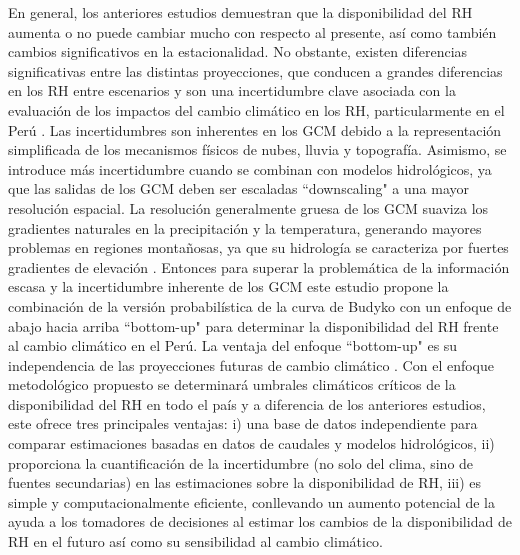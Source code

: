 \documentclass[12pt]{article}
\begin{document}
En general, los anteriores estudios demuestran que la disponibilidad del RH aumenta o no puede cambiar mucho con respecto al presente, así como también cambios significativos en la estacionalidad. No obstante, existen diferencias significativas entre las distintas proyecciones, que conducen a grandes diferencias en los RH entre escenarios \citep{Vuille2008} y son una incertidumbre clave asociada con la evaluación de los impactos del cambio climático en los RH, particularmente en el Perú \citep{VanSoesbergen2016}. Las incertidumbres son inherentes en los GCM debido a la representación simplificada de los mecanismos físicos de nubes, lluvia y topografía. Asimismo, se introduce más incertidumbre cuando se combinan con modelos hidrológicos, ya que las salidas de los GCM deben ser escaladas “downscaling" a una mayor resolución espacial. La resolución generalmente gruesa de los GCM suaviza los gradientes naturales en la precipitación y la temperatura, generando mayores problemas en regiones montañosas, ya que su hidrología se caracteriza por fuertes gradientes de elevación \citep{Buytaert2010}. Entonces para superar la problemática de la información escasa y la incertidumbre inherente de los GCM este estudio propone la combinación de la versión probabilística de la curva de Budyko \citep{Singh2015,Greve2015} con un enfoque de abajo hacia arriba ``bottom-up" para determinar la disponibilidad del RH frente al cambio climático en el Perú. La ventaja del enfoque ``bottom-up" es su independencia de las proyecciones futuras de cambio climático \citep{Singh2014,Poff2016}. Con el enfoque metodológico propuesto se determinará umbrales climáticos críticos de la disponibilidad del RH en todo el país y a diferencia de los anteriores estudios, este ofrece tres principales ventajas: i) una base de datos independiente para comparar estimaciones basadas en datos de caudales y modelos hidrológicos, ii) proporciona la cuantificación de la incertidumbre (no solo del clima, sino de fuentes secundarias) en las estimaciones sobre la disponibilidad de RH, iii) es simple y computacionalmente eficiente, conllevando un aumento potencial de la ayuda a los tomadores de decisiones al estimar los cambios de la disponibilidad de RH en el futuro así como su sensibilidad al cambio climático.
\end{document}
